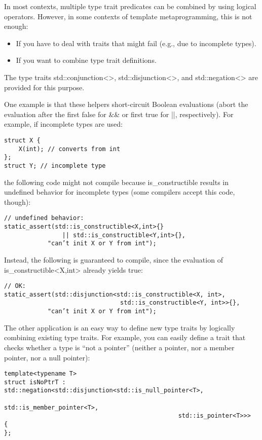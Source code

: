 
In most contexts, multiple type trait predicates can be combined by using logical operators. However, in some contexts of template metaprogramming, this is not enough:

\begin{itemize}
\item 
If you have to deal with traits that might fail (e.g., due to incomplete types).

\item 
If you want to combine type trait definitions.
\end{itemize}

The type traits std::conjunction<>, std::disjunction<>, and std::negation<> are provided for this purpose. 

One example is that these helpers short-circuit Boolean evaluations (abort the evaluation after the first false for \&\& or first true for ||, respectively). For example, if incomplete types are used:

\begin{lstlisting}[style=styleCXX]
struct X {
	X(int); // converts from int
};
struct Y; // incomplete type
\end{lstlisting}

the following code might not compile because is\_constructible results in undefined behavior for incomplete types (some compilers accept this code, though):

\begin{lstlisting}[style=styleCXX]
// undefined behavior:
static_assert(std::is_constructible<X,int>{}
				|| std::is_constructible<Y,int>{},
			"can’t init X or Y from int");
\end{lstlisting}

Instead, the following is guaranteed to compile, since the evaluation of is\_constructible<X,int> already yields true:

\begin{lstlisting}[style=styleCXX]
// OK:
static_assert(std::disjunction<std::is_constructible<X, int>,
								std::is_constructible<Y, int>>{},
			"can’t init X or Y from int");
\end{lstlisting}

The other application is an easy way to define new type traits by logically combining existing type traits. For example, you can easily define a trait that checks whether a type is “not a pointer” (neither a pointer, nor a member pointer, nor a null pointer):

\begin{lstlisting}[style=styleCXX]
template<typename T>
struct isNoPtrT : std::negation<std::disjunction<std::is_null_pointer<T>,
												std::is_member_pointer<T>,
												std::is_pointer<T>>>
{
};
\end{lstlisting}


